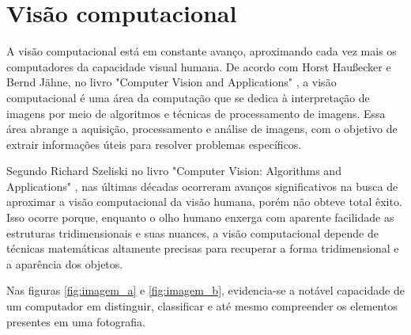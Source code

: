 \section{Visão computacional}
\label{sec:visao_comp}

A visão computacional está em constante avanço, aproximando cada vez mais os computadores da capacidade visual humana. De acordo com Horst Haußecker e Bernd Jähne, no livro "Computer Vision and Applications" \space\cite{comp_vision_and_applications}, a visão computacional é uma área da computação que se dedica à interpretação de imagens por meio de algoritmos e técnicas de processamento de imagens. Essa área abrange a aquisição, processamento e análise de imagens, com o objetivo de extrair informações úteis para resolver problemas específicos.

Segundo Richard Szeliski no livro "Computer Vision: Algorithms and Applications" \space\cite{computer_vision_richard}, nas últimas décadas ocorreram avanços significativos na busca de aproximar a visão computacional da visão humana, porém não obteve total êxito. Isso ocorre porque, enquanto o olho humano enxerga com aparente facilidade as estruturas tridimensionais e suas nuances, a visão computacional depende de técnicas matemáticas altamente precisas para recuperar a forma tridimensional e a aparência dos objetos.

Nas figuras \cref{fig:imagem_a} e \cref{fig:imagem_b}, evidencia-se a notável capacidade de um computador em distinguir, classificar e até mesmo compreender os elementos presentes em uma fotografia.

